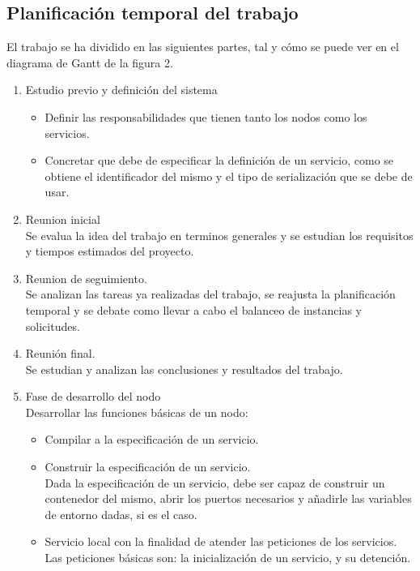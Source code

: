 \documentclass[11pt]{article}
\begin{document}
		\subsection{Planificación temporal del trabajo}
			El trabajo se ha dividido en las siguientes partes, tal y cómo se puede ver en el diagrama de Gantt de la figura 2.

			\begin{enumerate}
				\item Estudio previo y definición del sistema
					\begin{itemize}
						\item Definir las responsabilidades que tienen tanto los nodos como los servicios.
						\item Concretar que debe de especificar la definición de un servicio, como se obtiene el 
							identificador del mismo y el tipo de serialización que
							se debe de usar.
					\end{itemize}
				\item Reunion inicial \\
					Se evalua la idea del trabajo en terminos generales y se estudian los requisitos y tiempos estimados del proyecto. 
				\item Reunion de seguimiento. \\
					Se analizan las tareas ya realizadas del trabajo, se reajusta la planificación temporal y se debate como llevar a cabo 
					el balanceo de instancias y solicitudes.
				\item Reunión final. \\
					Se estudian y analizan las conclusiones y resultados del trabajo.
				\item Fase de desarrollo del nodo \\
					Desarrollar las funciones básicas de un nodo:
					\begin{itemize}
						\item Compilar a la especificación de un servicio.
						\item Construir la especificación de un servicio. \\
							Dada la especificación de un servicio, debe ser capaz de construir un contenedor del mismo,
							abrir los puertos necesarios y añadirle las variables de entorno dadas, si es el caso.
						\item Servicio local con la finalidad de atender las peticiones de los servicios. \\
							Las peticiones básicas son: la inicialización de un servicio, y su detención.

\end{itemize}
\end{enumerate}
\end{document}

